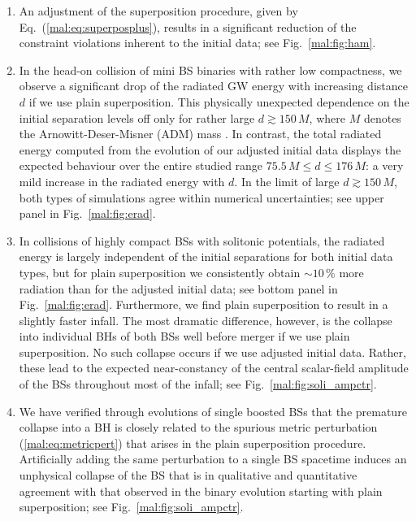 \begin{enumerate}
  \item An adjustment of the superposition procedure, given 
  by Eq.~(\ref{mal:eq:superposplus}), results in a significant
  reduction of the constraint violations inherent to the initial data;
  see Fig.~\ref{mal:fig:ham}.
  \item In the head-on collision of mini BS binaries with rather low compactness,
  we observe a significant drop of the radiated GW energy with increasing
  distance $d$ if we use plain superposition. This physically unexpected dependence
  on the initial separation levels off only for rather large 
  $d\gtrsim 150\,M$,
  where $M$ denotes the Arnowitt-Deser-Misner (ADM) mass
  \cite{Arnowitt:1962hi}. In contrast, the total radiated energy computed from
  the evolution of our adjusted initial data displays the expected
  behaviour over the entire studied range $75.5\,M\le d\le 176\,M$:
  a very mild increase in the radiated energy with $d$. In the limit of large
  $d \gtrsim 150\,M$, both types of simulations agree within numerical uncertainties;
  see upper panel in Fig.~\ref{mal:fig:erad}.
  \item In collisions of highly compact BSs with solitonic potentials,
  the radiated energy is largely independent of the initial separations
  for both initial data types, but for plain superposition we consistently
  obtain $\sim 10\,\%$ more radiation than for the adjusted initial data;
  see bottom panel in Fig.~\ref{mal:fig:erad}. Furthermore,
  we find plain superposition to result in a slightly faster infall.
  The most dramatic difference, however, is the collapse into individual BHs
  of both BSs well before merger if we use plain superposition. No such collapse
  occurs if we use adjusted initial data. Rather,
  these lead to the expected near-constancy of the central scalar-field amplitude
  of the BSs throughout most of the infall; see Fig.~\ref{mal:fig:soli_ampctr}.
  \item We have verified through evolutions of single boosted BSs that the
  premature collapse into a BH is closely related to the spurious metric
  perturbation (\ref{mal:eq:metricpert}) that arises in the plain superposition
  procedure. Artificially adding the same perturbation to a single BS
  spacetime induces an unphysical collapse of the BS that is in
  qualitative and quantitative agreement with that observed in
  the binary evolution starting with plain superposition;
  see Fig.~\ref{mal:fig:soli_ampctr}.
\end{enumerate}



